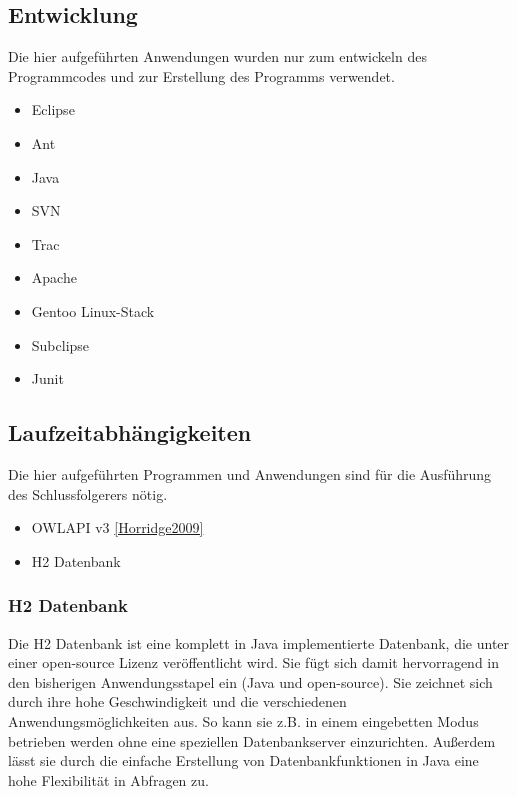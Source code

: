 \subsection{Entwicklung}

Die hier aufgeführten Anwendungen wurden nur zum entwickeln des Programmcodes und zur Erstellung des Programms verwendet.
\begin{itemize}
  \item Eclipse
  \item Ant
  \item Java
  \item SVN
  \item Trac
  \item Apache
  \item Gentoo Linux-Stack
  \item Subclipse
  \item Junit
\end{itemize}

\subsection{Laufzeitabhängigkeiten}
Die hier aufgeführten Programmen und Anwendungen sind für die Ausführung des Schlussfolgerers nötig.
\begin{itemize}
  \item OWLAPI v3 \ref{Horridge2009}
  \item H2 Datenbank
\end{itemize}
 
\subsubsection*{H2 Datenbank}
Die H2 Datenbank ist eine komplett in Java implementierte Datenbank, die unter einer open-source Lizenz veröffentlicht wird. Sie fügt sich damit hervorragend in den bisherigen Anwendungsstapel ein (Java und open-source). Sie zeichnet sich durch ihre hohe Geschwindigkeit und die verschiedenen Anwendungsmöglichkeiten aus. So kann sie z.B. in einem eingebetten Modus betrieben werden ohne eine speziellen Datenbankserver einzurichten. Außerdem lässt sie durch die einfache Erstellung von Datenbankfunktionen in Java eine hohe Flexibilität in Abfragen zu.
